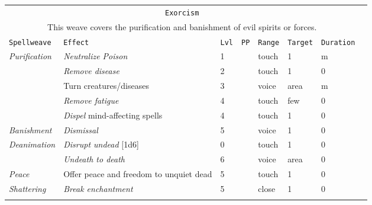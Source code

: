 \documentclass[10pt,a4paper]{article}
\begin{document}
\begin{table}[htbp!]
\begin{tabular}{llllllll}
  \multicolumn{7}{c}{\texttt{Exorcism}}\\
    \multicolumn{7}{c}{This weave covers the purification and banishment of evil spirits or forces.}\\
    \hline
    \texttt{Spellweave} & \texttt{Effect} & \texttt{Lvl} & \texttt{PP} & \texttt{Range} & \texttt{Target} & \texttt{Duration} \\
    \hline
    \multirow{1}{*}{\textit{Purification}} & \textit{Neutralize Poison} & 1 && touch & 1 & m\\
    										  & \textit{Remove disease} & 2 && touch & 1 & 0\\
    										  & Turn creatures/diseases & 3 && voice & area & m\\
    										  & \textit{Remove fatigue} & 4 && touch & few & 0\\
    										  & \textit{Dispel} mind-affecting spells & 4 && touch & 1 & 0\\
 	\hline
    \multirow{1}{*}{\textit{Banishment}} & \textit{Dismissal} & 5 && voice & 1 & 0\\
    \hline
    \multirow{1}{*}{\textit{Deanimation}} & \textit{Disrupt undead} [1d6] & 0 && touch & 1 & 0 \\
     									 & \textit{Undeath to death} & 6 && voice & area & 0\\
    \hline
    \multirow{1}{*}{\textit{Peace}} & Offer peace and freedom to unquiet dead & 5 && touch & 1 & 0\\
    \hline
    \multirow{1}{*}{\textit{Shattering}} & \textit{Break enchantment} & 5 && close & 1 & 0\\
    	&&&&&&\\    	
    	

\end{tabular}
\end{table}
\end{document}
